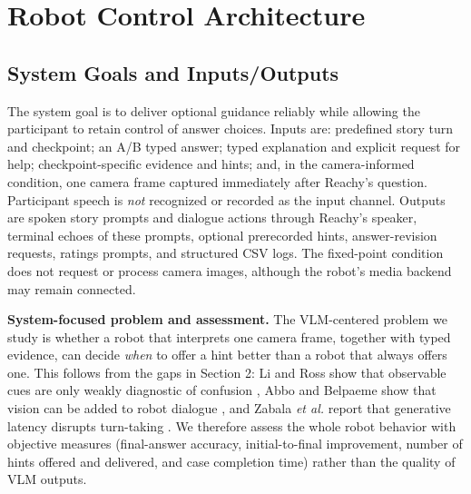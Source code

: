 \documentclass[conference]{IEEEtran}
\begin{document}
\section{Robot Control Architecture}
\subsection{System Goals and Inputs/Outputs}
The system goal is to deliver optional guidance reliably while allowing the participant to retain control of answer choices. Inputs are: predefined story turn and checkpoint; an A/B typed answer; typed explanation and explicit request for help; checkpoint-specific evidence and hints; and, in the camera-informed condition, one camera frame captured immediately after Reachy's question. Participant speech is \emph{not} recognized or recorded as the input channel. Outputs are spoken story prompts and dialogue actions through Reachy's speaker, terminal echoes of these prompts, optional prerecorded hints, answer-revision requests, ratings prompts, and structured CSV logs. The fixed-point condition does not request or process camera images, although the robot's media backend may remain connected.

\noindent\textbf{System-focused problem and assessment.} The VLM-centered problem we study is whether a robot that interprets one camera frame, together with typed evidence, can decide \emph{when} to offer a hint better than a robot that always offers one. This follows from the gaps in Section 2: Li and Ross show that observable cues are only weakly diagnostic of confusion \cite{li2023hmm,li2023invoking}, Abbo and Belpaeme show that vision can be added to robot dialogue \cite{abbo2025blind}, and Zabala \emph{et al.} report that generative latency disrupts turn-taking \cite{zabala2025storytelling}. We therefore assess the whole robot behavior with objective measures (final-answer accuracy, initial-to-final improvement, number of hints offered and delivered, and case completion time) rather than the quality of VLM outputs.
\end{document}

